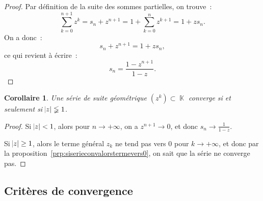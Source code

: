 \documentclass{article}
\DeclareMathOperator{\K}{\mathbb K}
\newcommand{\geomsum}[2]{\frac {1 - #1^{#2+1}}{1 - #1}}
\newtheorem{cor}[thm]{Corollaire}
\theoremstyle{definition}
\theoremstyle{remark}
\begin{document}
		\begin{proof} Par définition de la suite des sommes partielles, on trouve~:
		\[\sum_{k=0}^{n+1}z^k = s_n + z^{n+1} = 1 + \sum_{k=0}^nz^{k+1} = 1 + zs_n.\]
		On a donc~:
		\[s_n + z^{n+1} = 1 + zs_n,\]
		ce qui revient à écrire~:
		\[s_n = \geomsum zn.\]
		\end{proof}

		\begin{cor} Une série de suite géométrique $(z^k) \subset \K$ converge si et seulement si $\abs z \lneqq 1$. \end{cor}

		\begin{proof} Si $\abs z < 1$, alors pour $n \to +\infty$, on a $z^{n+1} \to 0$, et donc $s_n \to \frac 1{1-z}$.

		Si $\abs z \geq 1$, alors le terme général $z_k$ ne tend pas vers 0 pour $k \to +\infty$, et donc par la
		proposition~\ref{prp:siserieconvalorstermevers0}, on sait que la série ne converge pas.
		\end{proof}

	\subsection{Critères de convergence}
\end{document}
